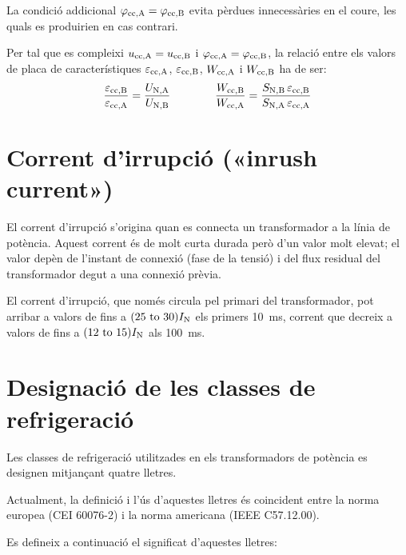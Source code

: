 La condició addicional $\varphi_\mathrm{cc,A} =\varphi_\mathrm{cc,B}$ evita pèrdues innecessàries en el coure, les quals es produirien en cas contrari.

Per tal que es compleixi $u_\mathrm{cc,A} = u_\mathrm{cc,B} $ i $\varphi_\mathrm{cc,A} =\varphi_\mathrm{cc,B}$, la relació entre els valors de placa de característiques $\varepsilon_\mathrm{cc,A}$, $\varepsilon_\mathrm{cc,B}$, $W_\mathrm{cc,A}$ i $W_\mathrm{cc,B}$ ha de ser:
\begin{equation}
    \frac{\varepsilon_\mathrm{cc,B}}{\varepsilon_\mathrm{cc,A}} = \frac{U_\mathrm{N,A}}{U_\mathrm{N,B}} \qquad\qquad
    \frac{W_\mathrm{cc,B}}{W_\mathrm{cc,A}} = \frac{S_\mathrm{N,B} \,\varepsilon_\mathrm{cc,B}}{S_\mathrm{N,A}\, \varepsilon_\mathrm{cc,A}}
\end{equation}

\section{Corrent d'irrupció («inrush current»)}

El corrent d'irrupció s'origina quan es  connecta un transformador a la línia de potència. Aquest corrent és de molt curta durada però d'un valor molt elevat; el valor depèn de l'instant de connexió (fase de la tensió) i del flux residual del transformador degut a una connexió prèvia.

El corrent d'irrupció, que només circula pel primari del transformador, pot arribar a valors de fins a $(\numrange{25}{30}) I\ped{N}$ els primers \SI{10}{ms}, corrent que decreix a valors de fins  a $(\numrange{12}{15}) I\ped{N}$ als \SI{100}{ms}.

\section{Designació de les classes de refrigeració}\label{sec:trafos-pot-refrig}
 

Les classes de refrigeració utilitzades en els transformadors de
potència es designen mitjançant quatre lletres.

Actualment, la definició i l'ús d'aquestes lletres és coincident
entre la norma europea (CEI 60076-2) i la norma americana
(IEEE C57.12.00).

Es defineix a continuació el significat d'aquestes lletres:

